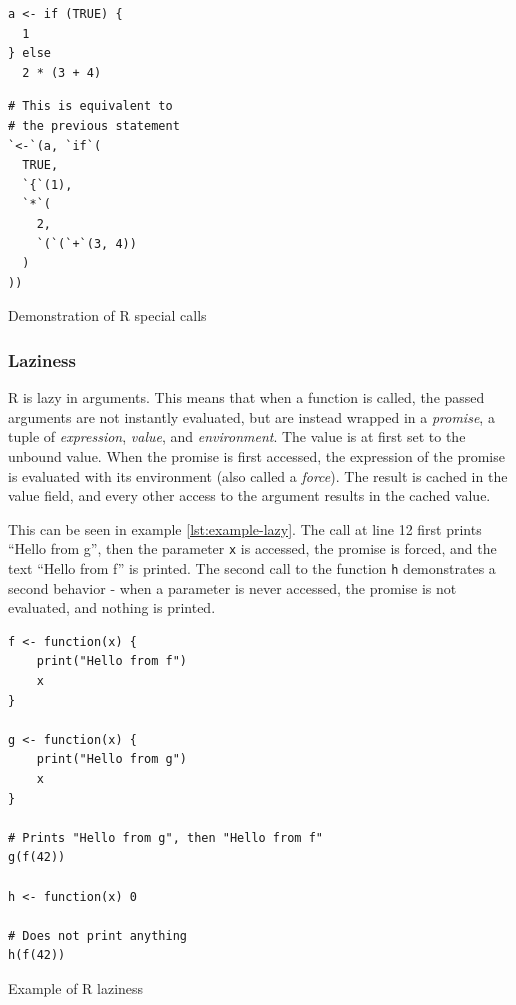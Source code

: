 \begin{listing}[t]
	\begin{sublisting}[t!]{0.47\textwidth}
		\centering
		\begin{verbatim}
a <- if (TRUE) {
  1
} else
  2 * (3 + 4)
    \end{verbatim}
	\end{sublisting}
	\hfill
	\begin{sublisting}[t!]{0.47\textwidth}
		\centering
		\begin{verbatim}
# This is equivalent to
# the previous statement
`<-`(a, `if`(
  TRUE,
  `{`(1),
  `*`(
    2,
    `(`(`+`(3, 4))
  )
))
    \end{verbatim}
	\end{sublisting}
	\caption{Demonstration of R special calls}\label{lst:r-special-calls}
\end{listing}

\subsubsection*{Laziness}

R is lazy in arguments. This means that when a function is called, the passed arguments are not instantly evaluated, but are instead wrapped in a \textit{promise}, a tuple of \textit{expression}, \textit{value}, and \textit{environment}. The value is at first set to the unbound value. When the promise is first accessed, the expression of the promise is evaluated with its environment (also called a \textit{force}). The result is cached in the value field, and every other access to the argument results in the cached value.

This can be seen in example \ref{lst:example-lazy}. The call at line 12 first prints \enquote{Hello from g}, then the parameter \texttt{x} is accessed, the promise is forced, and the text \enquote{Hello from f} is printed. The second call to the function \texttt{h} demonstrates a second behavior - when a parameter is never accessed, the promise is not evaluated, and nothing is printed.

\begin{listing}[h!]
	\centering
	\begin{verbatim}
f <- function(x) {
    print("Hello from f")
    x
}

g <- function(x) {
    print("Hello from g")
    x
}

# Prints "Hello from g", then "Hello from f"
g(f(42))

h <- function(x) 0

# Does not print anything
h(f(42))
  \end{verbatim}
	\caption{Example of R laziness}\label{lst:example-lazy}
\end{listing}

